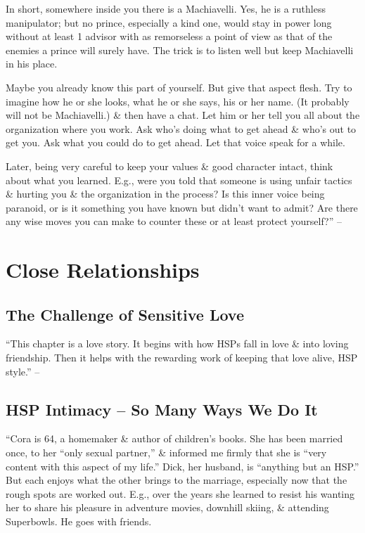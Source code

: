 \documentclass{article}
\numberwithin{equation}{section}
\begin{document}
In short, somewhere inside you there is a Machiavelli. Yes, he is a ruthless manipulator; but no prince, especially a kind one, would stay in power long without at least 1 advisor with as remorseless a point of view as that of the enemies a prince will surely have. The trick is to listen well but keep Machiavelli in his place.

Maybe you already know this part of yourself. But give that aspect flesh. Try to imagine how he or she looks, what he or she says, his or her name. (It probably will not be Machiavelli.) \& then have a chat. Let him or her tell you all about the organization where you work. Ask who's doing what to get ahead \& who's out to get you. Ask what you could do to get ahead. Let that voice speak for a while.

Later, being very careful to keep your values \& good character intact, think about what you learned. E.g., were you told that someone is using unfair tactics \& hurting you \& the organization in the process? Is this inner voice being paranoid, or is it something you have known but didn't want to admit? Are there any wise moves you can make to counter these or at least protect yourself?'' -- \cite[p. 168]{Aron2013}


\section{Close Relationships}

\subsection{The Challenge of Sensitive Love}
``This chapter is a love story. It begins with how HSPs fall in love \& into loving friendship. Then it helps with the rewarding work of keeping that love alive, HSP style.''  -- \cite[p. 169]{Aron2013}

\subsection{HSP Intimacy -- So Many Ways We Do It}
``Cora is 64, a homemaker \& author of children's books. She has been married once, to her ``only sexual partner,'' \& informed me firmly that she is ``very content with this aspect of my life.'' Dick, her husband, is ``anything but an HSP.'' But each enjoys what the other brings to the marriage, especially now that the rough spots are worked out. E.g., over the years she learned to resist his wanting her to share his pleasure in adventure movies, downhill skiing, \& attending Superbowls. He goes with friends.
\end{document}
